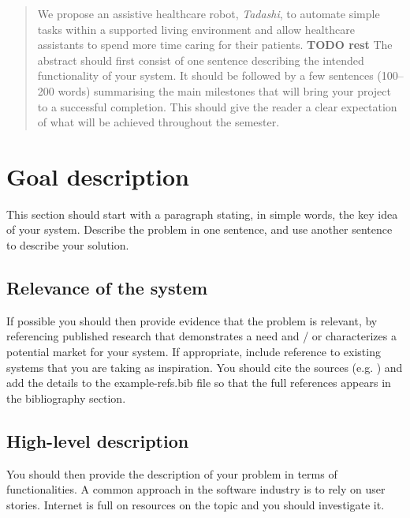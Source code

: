 \documentclass{article}
\begin{document}
 



\begin{abstract}
  We propose an assistive healthcare robot, {\it Tadashi}, to automate simple tasks within a supported living environment and allow healthcare assistants to spend more time caring for their patients.
  {\bf TODO rest}
The abstract should first consist of one sentence describing the intended functionality of your system. It should be followed by a few sentences (100--200 words) summarising the main milestones that will bring your project to a successful completion. This should give the reader a clear expectation of what will be achieved throughout the semester.
\end{abstract} 

\section{Goal description} 
This section should start with a paragraph stating, in simple words, the key idea of your system. Describe the problem in one sentence, and use another sentence to describe your solution.

\subsection{Relevance of the system} 
If possible you should then provide evidence that the problem is relevant, by referencing published research that demonstrates a need and / or characterizes a potential market for your system. If appropriate, include reference to existing systems that you are taking as inspiration. You should cite the sources (e.g. \cite{Newell81}) and add the details to the example-refs.bib file so that the full references appears in the bibliography section.

\subsection{High-level description} 
You should then provide the description of your problem in terms of functionalities. A common approach in the software industry is to rely on user stories. Internet is full on resources on the topic and you should investigate it.
\end{document}
